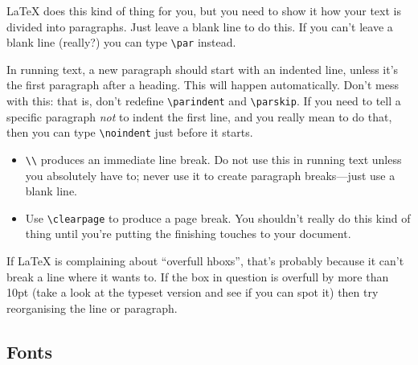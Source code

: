 \documentclass[dissertation]{softeng}
\begin{document}
{\LaTeX} does this kind of thing for you, but you need to show it how
your text is divided into paragraphs.  Just leave a blank line to do
this.  If you can't leave a blank line (really?) you can type
\verb|\par| instead.

In running text, a new paragraph should start with an indented line,
unless it's the first paragraph after a heading.  This will happen
automatically.  Don't mess with this: that is, don't redefine
\verb|\parindent| and \verb|\parskip|.  If you need to tell a specific
paragraph \emph{not} to indent the first line, and you really mean to
do that, then you can type \verb|\noindent| just before it starts.  

\begin{itemize}\raggedright
\item \verb|\\| produces an immediate line break.  Do not use this in
  running text unless you absolutely have to; never use it to create
  paragraph breaks---just use a blank line. 
\item Use \verb|\clearpage| to produce a page break.  You shouldn't
  really do this kind of thing until you're putting the finishing
  touches to your document.
\end{itemize}

If {\LaTeX} is complaining about ``overfull hboxs'', that's probably
because it can't break a line where it wants to.  If the box in
question is overfull by more than 10pt (take a look at the typeset
version and see if you can spot it) then try reorganising the line or
paragraph.

\subsection{Fonts}
\end{document}
